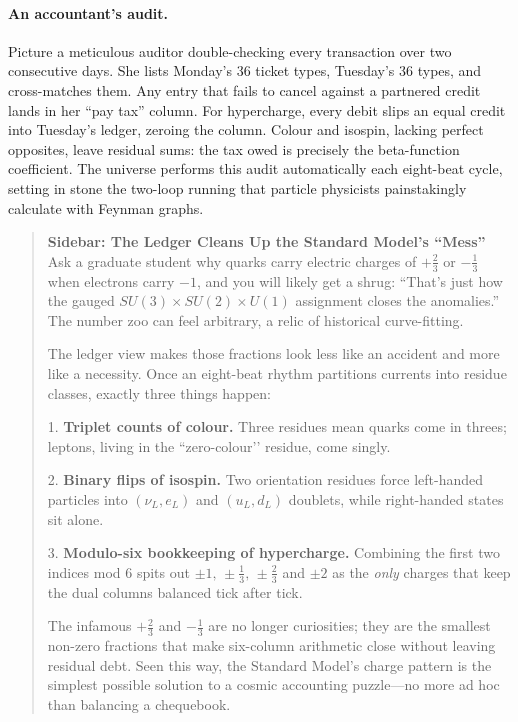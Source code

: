 \documentclass[11pt]{article}
\begin{document}
\paragraph{An accountant’s audit.}
Picture a meticulous auditor double-checking every transaction over two
consecutive days.  She lists Monday’s 36 ticket types, Tuesday’s 36
types, and cross-matches them.  Any entry that fails to cancel against a
partnered credit lands in her “pay tax” column.  For hypercharge, every
debit slips an equal credit into Tuesday’s ledger, zeroing the column.
Colour and isospin, lacking perfect opposites, leave residual sums: the
tax owed is precisely the beta-function coefficient.  The universe
performs this audit automatically each eight-beat cycle, setting in
stone the two-loop running that particle physicists painstakingly
calculate with Feynman graphs.

\begin{quote}
\small
\textbf{Sidebar: The Ledger Cleans Up the Standard Model’s “Mess”}\\[4pt]
Ask a graduate student why quarks carry electric charges of \(+\tfrac23\) or \(-\tfrac13\) when electrons carry \(-1\), and you will likely get a shrug: “That’s just how the gauged \(SU(3)\!\times\!SU(2)\!\times\!U(1)\) assignment closes the anomalies.”  The number zoo can feel arbitrary, a relic of historical curve-fitting.

The ledger view makes those fractions look less like an accident and more like a necessity.  Once an eight-beat rhythm partitions currents into residue classes, exactly three things happen:

1. \textbf{Triplet counts of colour.}  
   Three residues mean quarks come in threes; leptons, living in the “zero-colour’’ residue, come singly.

2. \textbf{Binary flips of isospin.}  
   Two orientation residues force left-handed particles into \((\nu_{L},e_{L})\) and \((u_{L},d_{L})\) doublets, while right-handed states sit alone.

3. \textbf{Modulo-six bookkeeping of hypercharge.}  
   Combining the first two indices mod 6 spits out \(\pm1,\,\pm\!\tfrac13,\,\pm\!\tfrac23\) and \(\pm2\) as the \emph{only} charges that keep the dual columns balanced tick after tick.

The infamous \(+\tfrac23\) and \(-\tfrac13\) are no longer curiosities; they are the smallest non-zero fractions that make six-column arithmetic close without leaving residual debt.  Seen this way, the Standard Model’s charge pattern is the simplest possible solution to a cosmic accounting puzzle—no more ad hoc than balancing a chequebook.
\end{quote}
\end{document}

